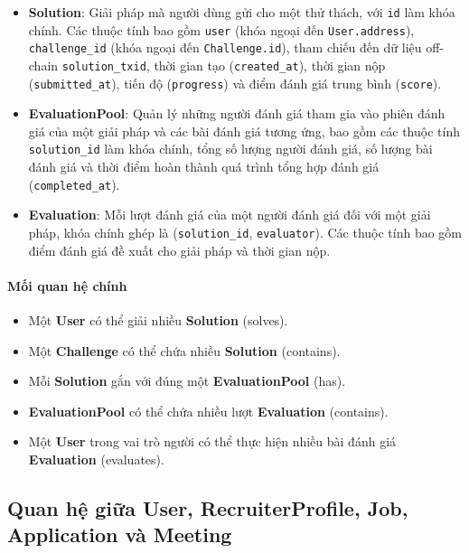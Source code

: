     \begin{itemize}
      \item \textbf{Solution}: Giải pháp mà người dùng gửi cho một thử thách, với \texttt{id} làm khóa chính. Các thuộc tính bao gồm \texttt{user} (khóa ngoại đến \texttt{User.address}), \texttt{challenge\_id} (khóa ngoại đến \texttt{Challenge.id}), tham chiếu đến dữ liệu off-chain \texttt{solution\_txid}, thời gian tạo (\texttt{created\_at}), thời gian nộp (\texttt{submitted\_at}), tiến độ (\texttt{progress}) và điểm đánh giá trung bình (\texttt{score}).
      \item \textbf{EvaluationPool}: Quản lý những người đánh giá tham gia vào phiên đánh giá của một giải pháp và các bài đánh giá tương ứng, bao gồm các thuộc tính \texttt{solution\_id} làm khóa chính, tổng số lượng người đánh giá, số lượng bài đánh giá và thời điểm hoàn thành quá trình tổng hợp đánh giá (\texttt{completed\_at}).
      \item \textbf{Evaluation}: Mỗi lượt đánh giá của một người đánh giá đối với một giải pháp, khóa chính ghép là (\texttt{solution\_id}, \texttt{evaluator}). Các thuộc tính bao gồm điểm đánh giá đề xuất cho giải pháp và thời gian nộp.
    \end{itemize}

  \paragraph{Mối quan hệ chính}
    \begin{itemize}
      \item Một \textbf{User} có thể giải nhiều \textbf{Solution} (solves).
      \item Một \textbf{Challenge} có thể chứa nhiều \textbf{Solution} (contains).
      \item Mỗi \textbf{Solution} gắn với đúng một \textbf{EvaluationPool} (has).
      \item \textbf{EvaluationPool} có thể chứa nhiều lượt \textbf{Evaluation} (contains).
      \item Một \textbf{User} trong vai trò người  có thể thực hiện nhiều bài đánh giá \textbf{Evaluation} (evaluates).
    \end{itemize}


\subsection{Quan hệ giữa User, RecruiterProfile, Job, Application và Meeting}

